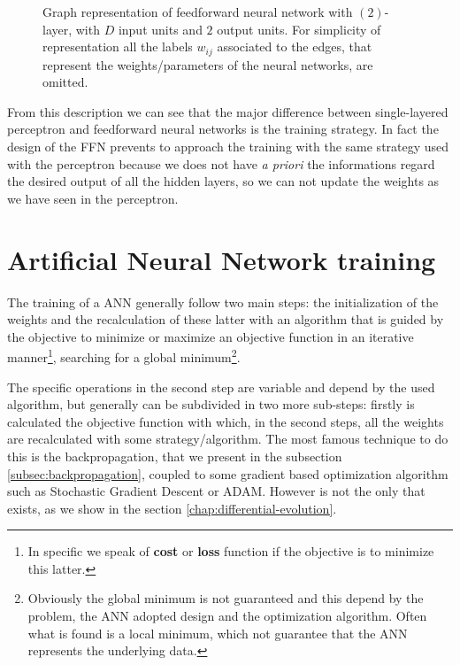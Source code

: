 \begin{figure}[t]
	\caption[Graph representation of feedforward neural network.]{Graph representation of feedforward neural network with $(2)$-layer, with $D$ input units and $2$ output units. For simplicity of representation all the labels $w_{ij}$ associated to the edges, that represent the weights/parameters of the neural networks, are omitted.}
	\label{fig:multilayer-perceptron}
\end{figure}

From this description we can see that the major difference between single-layered perceptron and feedforward neural networks is the training strategy. In fact the design of the FFN prevents to approach the training with the same strategy used with the perceptron because we does not have \textit{a priori} the informations regard the desired output of all the hidden layers, so we can not update the weights as we have seen in the perceptron.

\section{Artificial Neural Network training} 
The training of a ANN generally follow two main steps: the initialization of the weights and the recalculation of these latter with an algorithm that is guided by the objective to minimize or maximize an objective function in an iterative manner\footnote{In specific we speak of \textbf{cost} or \textbf{loss} function if the objective is to minimize this latter.}, searching for a global minimum\footnote{Obviously the global minimum is not guaranteed and this depend by the problem, the ANN adopted design and the optimization algorithm. Often what is found is a local minimum, which not guarantee that the ANN represents the underlying data.}.

The specific operations in the second step are variable and depend by the used algorithm, but generally can be subdivided in two more sub-steps: firstly is calculated the objective function with which, in the second steps, all the weights are recalculated with some strategy/algorithm. The most famous technique to do this is the backpropagation, that we present in the subsection \ref{subsec:backpropagation}, coupled to some gradient based optimization algorithm such as Stochastic Gradient Descent or ADAM. However is not the only that exists, as we show in the section \ref{chap:differential-evolution}.

